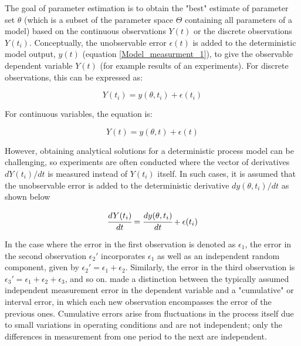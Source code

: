 \documentclass[../Article_Model_Parameters.tex]{subfiles}
\begin{document}
The goal of parameter estimation is to obtain the "best" estimate of parameter set $\theta$ (which is a subset of the parameter space $\Theta$ containing all parameters of a model) based on the continuous observations $Y(t)$ or the discrete observations $Y(t_i)$. Conceptually, the unobservable error $\epsilon(t)$ is added to the deterministic model output, $y(t)$ (equation \ref{Model_measurment_1}), to give the observable dependent variable $Y(t)$ (for example results of an experiments). For discrete observations, this can be expressed as:

{\footnotesize
	\begin{equation*}
		Y(t_i) = y(\theta, t_i) + \epsilon(t_i)
\end{equation*} }

For continuous variables, the equation is:

{\footnotesize
	\begin{equation*}
		Y(t) = y(\theta, t) + \epsilon(t)
\end{equation*} }

However, obtaining analytical solutions for a deterministic process model can be challenging, so experiments are often conducted where the vector of derivatives $dY(t_i)/dt$ is measured instead of $Y(t_i)$ itself. In such cases, it is assumed that the unobservable error is added to the deterministic derivative $dy(\theta, t_i)/dt$ as shown below

{\footnotesize
	\begin{equation}  \label{EQ: Measurment_noise}
		\cfrac{d Y(t_i)}{dt} = \cfrac{dy(\theta, t_i)}{dt} + \epsilon(t_i)
\end{equation} }

In the case where the error in the first observation is denoted as $\epsilon_1$, the error in the second observation $\epsilon_2'$ incorporates $\epsilon_1$ as well as an independent random component, given by $\epsilon_2' = \epsilon_1 + \epsilon_2$. Similarly, the error in the third observation is $\epsilon_3' = \epsilon_1 + \epsilon_2 + \epsilon_3$, and so on. \citet{Mandel1957}  made a distinction between the typically assumed independent measurement error in the dependent variable and a "cumulative" or interval error, in which each new observation encompasses the error of the previous ones. Cumulative errors arise from fluctuations in the process itself due to small variations in operating conditions and are not independent; only the differences in measurement from one period to the next are independent.
\end{document}
